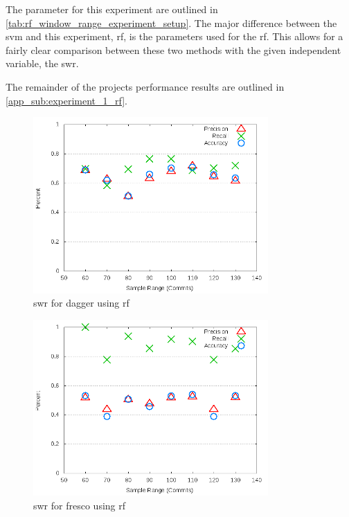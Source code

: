 The parameter for this experiment are outlined in \autoref{tab:rf_window_range_experiment_setup}. The major difference between the \gls{svm} and this experiment, \gls{rf}, is the parameters used for the \gls{rf}. This allows for a fairly clear comparison between these two methods with the given independent variable, the \gls{swr}.

The remainder of the projects performance results are outlined in \autoref{app_sub:experiment_1_rf}.

\begin{figure}[!ht]
    \centering
        \includegraphics[width=0.8\textwidth]{images/rf/test_1/dagger_sample_range}
        \caption{\gls{swr} for dagger using \gls{rf}}
        \label{fig:test_1_dagger_rf}
\end{figure}


\begin{figure}[!ht]
    \centering

        \includegraphics[width=0.8\textwidth]{images/rf/test_1/fresco_sample_range}
        \caption{\gls{swr} for fresco using \gls{rf}}
        \label{fig:test_1_fresco_rf}
\end{figure}

